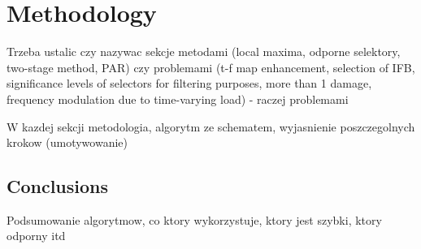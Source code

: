 \chapter{Methodology}\label{methodology}

\label{ch:methodology}

Trzeba ustalic czy nazywac sekcje metodami (local maxima, odporne selektory, two-stage method, PAR) czy problemami (t-f map enhancement, selection of IFB, significance levels of selectors for filtering purposes, more than 1 damage, frequency modulation due to time-varying load) - raczej problemami

W kazdej sekcji metodologia, algorytm ze schematem, wyjasnienie poszczegolnych krokow (umotywowanie)














\section{Conclusions}\label{methodology_conclusions}

Podsumowanie algorytmow, co ktory wykorzystuje, ktory jest szybki, ktory odporny itd